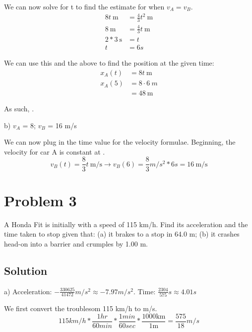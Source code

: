 \documentclass[12pt]{article}
\begin{document}
We can now solve for t to find the estimate for when $v_A = v_B$.
\begin{align*}
    8t\ \unit{\m} &= \frac{4}{3} t^2\ \unit{\m} \\
    8\ \unit{\m} &= \frac{4}{3} t\ \unit{\m} \\
    2*3\ \unit{\s} &= t \\
    t &= 6 \unit{s}
\end{align*}

We can use this and the above to find the position at the given time:
\begin{align*}
    x_A(t) &= 8t\ \unit{\m} \\
    x_A(5) &= 8 \cdot 6\ \unit{m} \\
    &= 48\ \unit{\m}
\end{align*}

As such, . 


b) $v_A$ = 8; $v_B$ = 16 m/s

We can now plug in the time value for the velocity formulae. Beginning, the velocity for car A is constant at . 
\begin{equation*}
    v_B(t) = \frac{8}{3}t\ \unit{\m/\s} \rightarrow v_B(6) = \frac{8}{3}\unit{m/s^2} * 6\unit{s} = \boxed{16\ \unit{\m/\s}}
\end{equation*}

\pagebreak

\section*{Problem 3}

A Honda Fit is initially with a speed of 115 km/h. Find its acceleration and the time taken
to stop given that: (a) it brakes to a stop in 64.0 m; (b) it crashes head-on into a barrier and
crumples by 1.00 m.
\subsection*{Solution}
a) Acceleration: $-\frac{330625}{41472}\unit{m/s^2} \approx -7.97 \unit{m/s^2}$. 
Time: $\frac{2304}{575} s \approx 4.01 s$

We first convert the troublesom 115 km/h to m/s.
\begin{equation*}
    115 \unit{km/h} * \frac{1 \unit{hr}}{60 \unit{min}} * \frac{1 \unit{min}}{60 \unit{sec}} * \frac{1000 \unit{\kilo\meter}}{1 \unit{\meter}} = \frac{575}{18} \unit{m/s}
\end{equation*}
\end{document}
